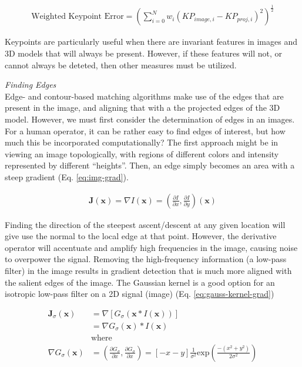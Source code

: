 \begin{equation}
    \begin{aligned}
        \text{Weighted Keypoint Error} = (\sum_{i = 0}^{N}w_{i}(KP_{image,i} - KP_{proj,i})^2)^{\frac{1}{2}}
    \end{aligned}
    \label{eq:wkp-error}
\end{equation}

Keypoints are particularly useful when there are invariant features in images and 3D models that will always be present. However, if these features will not, or cannot always be deteted, then other measures must be utilized.

\emph{Finding Edges}\\
Edge- and contour-based matching algorithms make use of the edges that are present in the image, and aligning that with a the projected edges of the 3D model. However, we must first consider the determination of edges in an images. For a human operator, it can be rather easy to find edges of interest, but how much this be incorporated computationally? The first approach might be in viewing an image topologically, with regions of different colors and intensity represented by different ``heights''. Then, an edge simply becomes an area with a steep gradient (Eq. \ref{eq:img-grad}).

\begin{equation}
    \begin{aligned}
        \mathbf{J}(\mathbf{x}) = \nabla I(\mathbf{x}) = (\frac{\partial I}{\partial x}, \frac{\partial I}{\partial y})(\mathbf{x})
    \end{aligned}
    \label{eq:img-grad}
\end{equation}

Finding the direction of the steepest ascent/descent at any given location will give use the normal to the local edge at that point. However, the derivative operator will accentuate and amplify high frequencies in the image, causing noise to overpower the signal. Removing the high-frequency information (a low-pass filter) in the image results in gradient detection that is much more aligned with the salient edges of the image. The Gaussian kernel is a good option for an isotropic low-pass filter on a 2D signal (image) (Eq. \ref{eq:gauss-kernel-grad})

\begin{equation}
    \begin{aligned}
        \mathbf{J}_{\sigma}(\mathbf{x}) &= \nabla [G_\sigma (\mathbf{x} * I(\mathbf{x}))] \\
        &= \nabla G_\sigma (\mathbf{x}) * I(\mathbf{x}) \\
        &\text{where} \\
        \nabla G_\sigma (\mathbf{x}) &= (\frac{\partial G_{\sigma}}{\partial x}, \frac{\partial G_{\sigma}}{\partial x}) = [-x - y]\frac{1}{\sigma^{2}}\text{exp}(\frac{-(x^2 + y^2)}{2 \sigma^2})
    \end{aligned}
    \label{eq:gauss-kernel-grad}
\end{equation}


